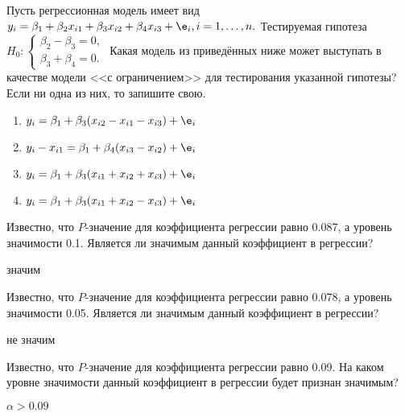 \documentclass[pdftex,11pt,openany]{book}\usepackage[]{graphicx}\usepackage[]{color}
\begin{document}
\begin{problem} %
 Пусть регрессионная модель имеет вид $y_i= \beta_1+ \beta_2 x_{i1}+ \beta_3 x_{i2}+ \beta_4 x_{i3}+\e_i, i=1,\dots,n.$ Тестируемая гипотеза 
$H_0:
  \begin{cases}
    \beta_2 - \beta_3=0, \\
    \beta_3 + \beta_4=0. 
 \end{cases}$
Какая модель из приведённых ниже может выступать в качестве модели <<с ограничением>> для тестирования указанной гипотезы? Если ни одна из них, то запишите свою.
\begin{enumerate}
\item $y_i = \beta_1 + \beta_3 (x_{i2}-x_{i1}-x_{i3})+ \e_i$
\item $y_i-x_{i1} = \beta_1+ \beta_4 (x_{i3}-x_{i2})+ \e_i$
\item $y_i = \beta_1+ \beta_3 (x_{i1}+x_{i2}+x_{i3})+ \e_i$
\item $y_i = \beta_1+ \beta_3 (x_{i1}+x_{i2}-x_{i3})+ \e_i$
\end{enumerate}
\end{problem}

\begin{solution}
\end{solution}


\begin{problem} %
  Известно, что $P$-значение для коэффициента регрессии равно 0.087, а уровень значимости 0.1. Является ли значимым данный коэффициент в регрессии?
\end{problem}

\begin{solution}
значим
\end{solution}


\begin{problem} %
 Известно, что $P$-значение для коэффициента регрессии равно 0.078, а уровень значимости 0.05. Является ли значимым данный коэффициент в регрессии?
\end{problem}

\begin{solution}
не значим
\end{solution}


\begin{problem}
  Известно, что $P$-значение для коэффициента регрессии равно 0.09. На каком
уровне значимости данный коэффициент в регрессии будет признан значимым?
\end{problem}

\begin{solution}
$\alpha>0.09$
\end{solution}
\end{document}
